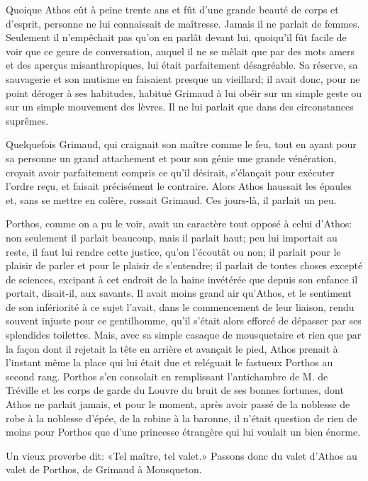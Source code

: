 Quoique Athos eût à peine trente ans et fût d'une grande beauté de corps et d'esprit, personne ne lui connaissait de maîtresse. Jamais il ne parlait de femmes. Seulement il n'empêchait pas qu'on en parlât devant lui, quoiqu'il fût facile de voir que ce genre de conversation, auquel il ne se mêlait que par des mots amers et des aperçus misanthropiques, lui était parfaitement désagréable. Sa réserve, sa sauvagerie et son mutisme en faisaient presque un vieillard; il avait donc, pour ne point déroger à ses habitudes, habitué Grimaud à lui obéir sur un simple geste ou sur un simple mouvement des lèvres. Il ne lui parlait que dans des circonstances suprêmes. 

Quelquefois Grimaud, qui craignait son maître comme le feu, tout en ayant pour sa personne un grand attachement et pour son génie une grande vénération, croyait avoir parfaitement compris ce qu'il désirait, s'élançait pour exécuter l'ordre reçu, et faisait précisément le contraire. Alors Athos haussait les épaules et, sans se mettre en colère, rossait Grimaud. Ces jours-là, il parlait un peu. 

Porthos, comme on a pu le voir, avait un caractère tout opposé à celui d'Athos: non seulement il parlait beaucoup, mais il parlait haut; peu lui importait au reste, il faut lui rendre cette justice, qu'on l'écoutât ou non; il parlait pour le plaisir de parler et pour le plaisir de s'entendre; il parlait de toutes choses excepté de sciences, excipant à cet endroit de la haine invétérée que depuis son enfance il portait, disait-il, aux savants. Il avait moins grand air qu'Athos, et le sentiment de son infériorité à ce sujet l'avait, dans le commencement de leur liaison, rendu souvent injuste pour ce gentilhomme, qu'il s'était alors efforcé de dépasser par ses splendides toilettes. Mais, avec sa simple casaque de mousquetaire et rien que par la façon dont il rejetait la tête en arrière et avançait le pied, Athos prenait à l'instant même la place qui lui était due et reléguait le fastueux Porthos au second rang. Porthos s'en consolait en remplissant l'antichambre de M. de Tréville et les corps de garde du Louvre du bruit de ses bonnes fortunes, dont Athos ne parlait jamais, et pour le moment, après avoir passé de la noblesse de robe à la noblesse d'épée, de la robine à la baronne, il n'était question de rien de moins pour Porthos que d'une princesse étrangère qui lui voulait un bien énorme. 

Un vieux proverbe dit: «Tel maître, tel valet.» Passons donc du valet d'Athos au valet de Porthos, de Grimaud à Mousqueton. 

